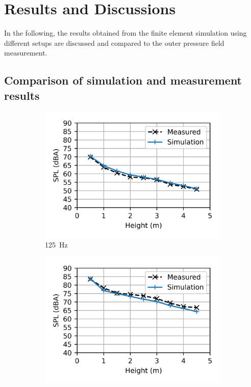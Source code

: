\chapter{Results and Discussions}
\label{chap:results}

In the following, the results obtained from the finite element simulation using different setups are discussed and compared to the outer pressure field measurement.

\section{Comparison of simulation and measurement results}



\begin{figure}%
	\centering
	\begin{subfigure}[b]{0.49\textwidth}
		\centering
		\includegraphics{fig/chap5/initial_model/third_octave_over_height/125_Hz.png}
		\caption{\SI{125}{\hertz}}
	\end{subfigure}
	\hfill
	\begin{subfigure}[b]{0.49\textwidth}
		\centering
		\includegraphics{fig/chap5/initial_model/third_octave_over_height/400_Hz.png}

\end{subfigure}
\end{figure}
